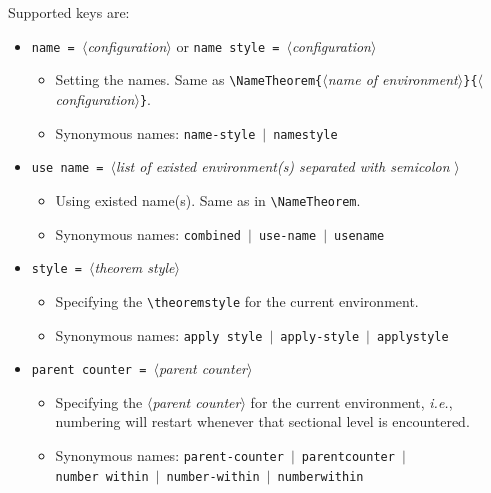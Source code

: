 \documentclass[classical]{einfart}
\newcommand{\meta}[1]{$\langle${\normalfont\itshape#1}$\rangle$}
\newcommand{\commandoption}[1]{\texttt{\textcolor{code-keys}{#1}}}
\begin{document}
Supported keys are:
\vspace{-.2\baselineskip}
\begin{itemize}[label=,leftmargin=1.25em,itemindent=-1.25em]
    \item \commandoption{name}\lstinline| = |\meta{configuration} \quad or \quad \commandoption{name style}\lstinline| = |\meta{configuration}
        \begin{itemize}
            \item Setting the names. Same as \lstinline|\NameTheorem{|\meta{name of environment}\lstinline|}{|\meta{configuration}\lstinline|}|.
            \item Synonymous names: \commandoption{name-style} \,$|$\, \commandoption{namestyle}
        \end{itemize}
    \item \commandoption{use name}\lstinline| = |\meta{list of existed environment(s) separated with semicolon \textquote{ ; }}
        \begin{itemize}
            \item Using existed name(s). Same as in \lstinline|\NameTheorem|.
            \item Synonymous names: \commandoption{combined} \,$|$\, \commandoption{use-name} \,$|$\, \commandoption{usename}
        \end{itemize}
    \item \commandoption{style}\lstinline| = |\meta{theorem style}
        \begin{itemize}
            \item Specifying the \lstinline|\theoremstyle| for the current environment.
            \item Synonymous names: \commandoption{apply style} \,$|$\, \commandoption{apply-style} \,$|$\, \commandoption{applystyle}
        \end{itemize}
    \item \commandoption{parent counter}\lstinline| = |\meta{parent counter}
        \begin{itemize}
            \item Specifying the \meta{parent counter} for the current environment, \emph{i.e.}, numbering will restart whenever that sectional level is encountered.
            \item Synonymous names: \commandoption{parent-counter} \,$|$\, \commandoption{parentcounter} \,$|$\, \\\phantom{Synonymous names: }\commandoption{number within} \,$|$\, \commandoption{number-within} \,$|$\, \commandoption{numberwithin}

\end{itemize}
\end{itemize}
\end{document}
